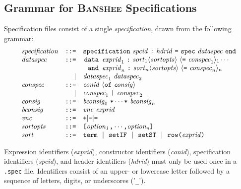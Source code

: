 \documentclass[10pt]{article}
\newcommand{\banshee}{\textsc{Banshee}}
\newcommand{\id}[1]{{\it #1\/}}
\newcommand{\bra}[1]{\langle {#1} \rangle}
\def\kw#1{\hbox{\tt #1}}
\begin{document}
\subsection{Grammar for \banshee{} Specifications}

Specification files consist of a single \textit{specification}, drawn from
the following grammar:
$$
\begin{array}{lrl}
  \id{specification} &\kw{::=}& \kw{specification} ~\id{spcid} ~\kw{:}~ \id{hdrid} ~\kw{=} ~\kw{spec} ~\id{dataspec}~ \kw{end} \\
  \id{dataspec} & \kw{::=} & 
  \!\!\begin{array}[t]{rl}\kw{data} \!\!\! & \id{exprid}_1 ~\kw{:}~ \id{sort}_1 \bra{\id{sortopts}} 
               ~\bra{\kw{=} ~\id{conspec}_1}_1 \cdots \\ 
               \kw{and}\!\!\! & \id{exprid}_n ~\kw{:}~ \id{sort}_n \bra{\id{sortopts}} ~\bra{\kw{=} ~\id{conspec}_n}_n 
       \end{array} \\
  & | & \id{dataspec}_1 ~ \id{dataspec}_2 \\
  \id{conspec} & \kw{::=} & \id{conid} ~\bra{\kw{of} ~\id{consig}} \\
               & | & \id{conspec}_1~\kw{|} ~\id{conspec}_2 \\ 
 \id{consig} & \kw{::=} & \id{bconsig}_0~\kw{*} \cdots \kw{*}~\id{bconsig}_n \\
  \id{bconsig} & \kw{::=} & \id{vnc} ~\id{exprid} \\
  \id{vnc} & \kw{::=} & \kw{+} | \kw{-} | \kw{=} \\
  \id{sortopts} & \kw{::=} & \kw{[} \id{option_1} \kw{,} \cdots \kw{,}\id{option_n} \kw{]} \\
  \id{sort} & \kw{::=} & \kw{term} ~~|~~ \kw{setIF} ~~|~~ \kw{setST} ~~|~~ \kw{row(}\id{exprid}\kw{)}  \\ 
 

\end{array}
$$

Expression identifiers (\textit{exprid}), constructor identifiers 
(\textit{conid}), specification identifiers (\textit{spcid}), and header 
identifiers (\textit{hdrid}) must only be used once in a \texttt{.spec} file. 
Identifiers consist of an upper- or lowercase letter followed by a sequence 
of letters, digits, or underscores ('\texttt{\_}').



\appendix{}
\end{document}
